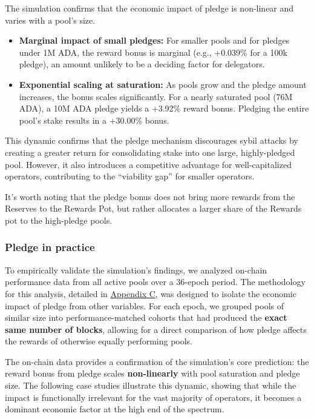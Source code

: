 \documentclass[11pt, letterpaper]{article}
\begin{document}
The simulation confirms that the economic impact of pledge is non-linear and
varies with a pool's size.

\begin{itemize}
	\item \textbf{Marginal impact of small pledges:} For smaller pools and for pledges under 1M ADA, the reward
	      bonus is marginal (e.g., +0.039\% for a 100k pledge), an amount unlikely to be a deciding factor for
	      delegators.
	\item \textbf{Exponential scaling at saturation:} As pools grow and the pledge amount increases, the bonus
	      scales significantly. For a nearly saturated pool (76M ADA), a 10M ADA pledge yields a +3.92\% reward
	      bonus. Pledging the entire pool's stake results in a +30.00\% bonus.
\end{itemize}

This dynamic confirms that the pledge mechanism discourages sybil attacks by
creating a greater return for consolidating stake into one large,
highly-pledged pool. However, it also introduces a competitive advantage for
well-capitalized operators, contributing to the ``viability gap'' for smaller
operators.

It's worth noting that the pledge bonus does not bring more rewards from the
Reserves to the Rewards Pot, but rather allocates a larger share of the Rewards
pot to the high-pledge pools.

\subsubsection{Pledge in practice}

To empirically validate the simulation's findings, we analyzed on-chain
performance data from all active pools over a 36-epoch period. The methodology
for this analysis, detailed in \href{https://github.com/input-output-hk/spo-incentives/blob/main/spo_incentives/appendixC.txt}{Appendix C}, 
was designed to isolate the economic impact of pledge from other variables. For each epoch, we grouped pools of
similar size into performance-matched cohorts that had produced the
\textbf{exact same number of blocks}, allowing for a direct comparison of how
pledge affects the rewards of otherwise equally performing pools.

The on-chain data provides a confirmation of the simulation's core prediction: the reward
bonus from pledge scales \textbf{non-linearly} with pool saturation and pledge size.
The following case studies illustrate this dynamic, showing that while the impact is functionally
irrelevant for the vast majority of operators, it becomes a dominant economic
factor at the high end of the spectrum.
\end{document}
